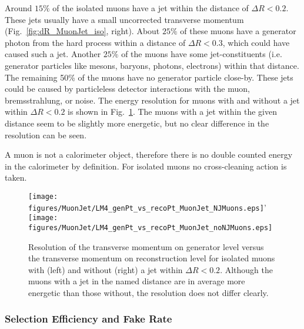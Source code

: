 \documentclass{cmspaper}
\begin{document}
Around \(15\%\) of the isolated muons have a jet within the distance of
\(\Delta R < 0.2\). These jets usually have a small uncorrected transverse
momentum (Fig.~\ref{fig:dR_MuonJet_iso}, right). About \(25\%\) of these muons
have a generator photon from the hard process within a distance of \(\Delta R <
0.3\), which could have caused such a jet. Another \(25\%\) of the muons have
some jet-constituents (i.e. generator particles like mesons, baryons,
photons, electrons) within that distance. 
The remaining 50\% of the muons have no generator particle
close-by. These jets could be caused by particleless detector interactions with
the muon, bremsstrahlung, or noise. 
The energy resolution for muons with and without a jet within
\(\Delta R < 0.2\) is shown in Fig.~\ref{fig:genPt_vs_recoPt_isoMuon}. The
muons with a jet within the given distance seem to be slightly more energetic,
but no clear difference in the resolution can be seen. 

A muon is not a calorimeter object, therefore there is no double counted
energy in the calorimeter by definition. For isolated muons no cross-cleaning
action is taken.
\begin{figure}[hb]
\begin{center}
    \texttt{[image: figures/MuonJet/LM4\_genPt\_vs\_recoPt\_MuonJet\_NJMuons.eps]}'
    \texttt{[image: figures/MuonJet/LM4\_genPt\_vs\_recoPt\_MuonJet\_noNJMuons.eps]}
    \caption{Resolution of the transverse momentum on generator level versus
the transverse momentum on reconstruction level for isolated muons with (left)
and without (right) a jet within \(\Delta R < 0.2\). Although the muons with a
jet in the named distance are in average more energetic than those without, the
resolution does not differ clearly.}
\label{fig:genPt_vs_recoPt_isoMuon}
\end{center}
\end{figure}

\subsubsection{Selection Efficiency and Fake Rate}
\end{document}
